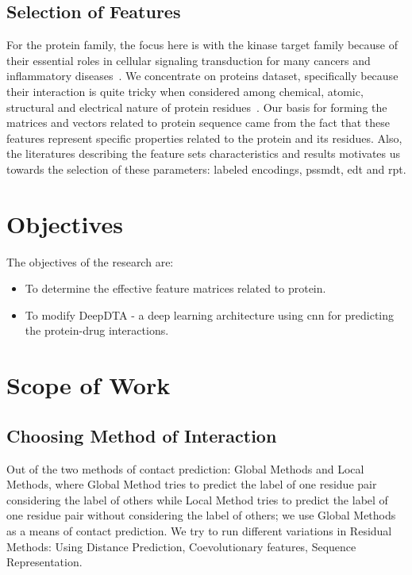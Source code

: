 \subsection{Selection of Features}

For the protein family, the focus here is with the kinase target family because of their essential roles in cellular signaling transduction for many cancers and inflammatory diseases~\citep{Tang2013,Kanehisa2000}. We concentrate on proteins dataset, specifically because their interaction is quite tricky when considered among chemical, atomic, structural and electrical nature of protein residues~\citep{Mathai2019}. Our basis for forming the matrices and vectors related to protein sequence came from the fact that these features represent specific properties related to the protein and its residues. Also, the literatures describing the feature sets characteristics and results motivates us towards the selection of these parameters: labeled encodings, \acrshort{pssmdt}, \acrshort{edt} and \acrshort{rpt}.


\section{Objectives}
The objectives of the research are:
\begin{itemize}
    \setlength\parindent{36pt}
    \item To determine the effective feature matrices related to protein.
    \item To modify DeepDTA - a deep learning architecture using \acrfull{cnn} for predicting the protein-drug interactions.
\end{itemize}

\section{Scope of Work}


\subsection{Choosing Method of Interaction}
Out of the two methods of contact prediction: Global Methods and Local Methods, where Global Method tries to predict the label of one residue pair considering the label of others while Local Method tries to predict the label of one residue pair without considering the label of others; we use Global Methods as a means of contact prediction. We try to run different variations in Residual Methods: Using Distance Prediction, Coevolutionary features, Sequence Representation. 

